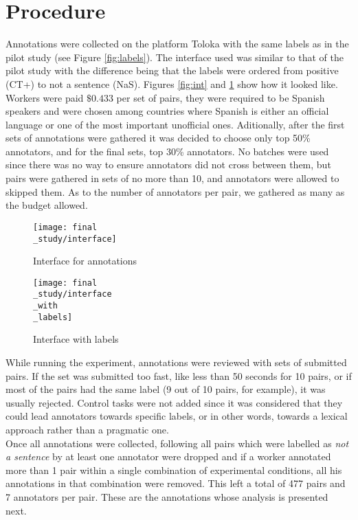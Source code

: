 \section{Procedure}
Annotations were collected on the platform Toloka \citep{Pavlichenko2021crowdspeech} with the same labels as in the pilot study (see Figure \ref{fig:labels}). The interface used was similar to that of the pilot study with the difference being that the labels were ordered from positive (CT+) to not a sentence (NaS). Figures \ref{fig:int} and \ref{fig:intlab} show how it looked like. Workers were paid $\$0.433$ per set of pairs, they were required to be Spanish speakers and were chosen among countries where Spanish is either an official language or one of the most important unofficial ones. Aditionally, after the first sets of annotations were gathered it was decided to choose only top 50\% annotators, and for the final sets, top 30\% annotators. No batches were used since there was no way to ensure annotators did not cross between them, but pairs were gathered in sets of no more than 10, and annotators were allowed to skipped them. As to the number of annotators per pair, we gathered as many as the budget allowed.\\

\begin{figure}
\centering
\parbox{5cm}{\texttt{[image: final\\\_study/interface]}
\caption{Interface for annotations}\label{fig:int}}
\qquad
\begin{minipage}{5cm}
\texttt{[image: final\\\_study/interface\\\_with\\\_labels]}
\caption{Interface with labels}\label{fig:intlab}
\end{minipage}
\end{figure}

While running the experiment, annotations were reviewed with sets of submitted pairs. If the set was submitted too fast, like less than 50 seconds for 10 pairs, or if most of the pairs had the same label (9 out of 10 pairs, for example), it was usually rejected. Control tasks were not added since it was considered that they could lead annotators towards specific labels, or in other words, towards a lexical approach rather than a pragmatic one.\\

Once all annotations were collected, following \citet{pavlick2019inherent} all pairs which were labelled as \textit{not a sentence} by at least one annotator were dropped and if a worker annotated more than 1 pair within a single combination of experimental conditions, all his annotations in that combination were removed. This left a total of 477 pairs and 7 annotators per pair. These are the annotations whose analysis is presented next.\\


